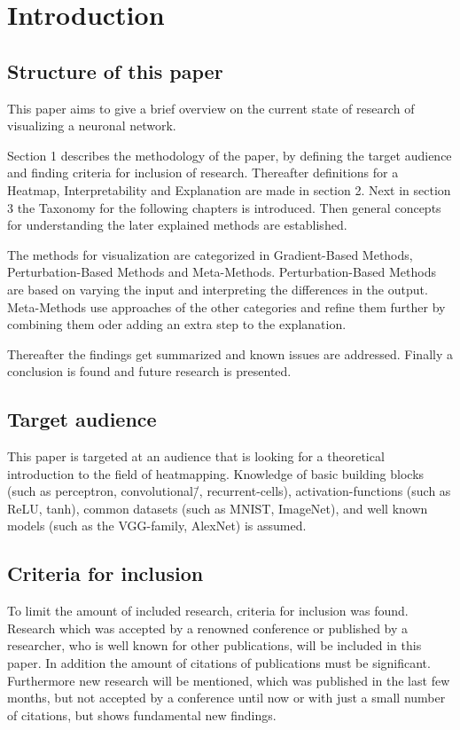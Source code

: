 \section{Introduction}

\subsection{Structure of this paper}
This paper aims to give a brief overview on the current state of research of visualizing a neuronal network. 
\par 
Section 1 describes the methodology of the paper, by defining the target audience and finding criteria for inclusion of research. Thereafter definitions for a Heatmap, Interpretability and Explanation are made in section 2. Next in section 3 the Taxonomy for the following chapters is introduced. Then general concepts for understanding the later explained methods are established.
\par
The methods for visualization are categorized in Gradient-Based Methods, Perturbation-Based Methods and Meta-Methods.
Perturbation-Based Methods are based on varying the input and interpreting the differences in the output.
Meta-Methods use approaches of the other categories and refine them further by combining them oder adding an extra step to the explanation.
\par
Thereafter the findings get summarized and known issues are addressed.
Finally a conclusion is found and future research is presented.

\subsection{Target audience}
This paper is targeted at an audience that is looking for a theoretical introduction to the field of heatmapping. Knowledge of basic building blocks (such as perceptron, convolutional\=/, recurrent-cells), activation-functions (such as ReLU, tanh), common datasets (such as MNIST, ImageNet), and well known models (such as the VGG-family, AlexNet) is assumed.

\subsection{Criteria for inclusion}
To limit the amount of included research, criteria for inclusion was found. Research which was accepted by a renowned conference or published by a researcher, who is well known for other publications, will be included in this paper. In addition the amount of citations of publications must be significant. Furthermore new research will be mentioned, which was published in the last few months, but not accepted by a conference until now or with just a small number of citations, but shows fundamental new findings.